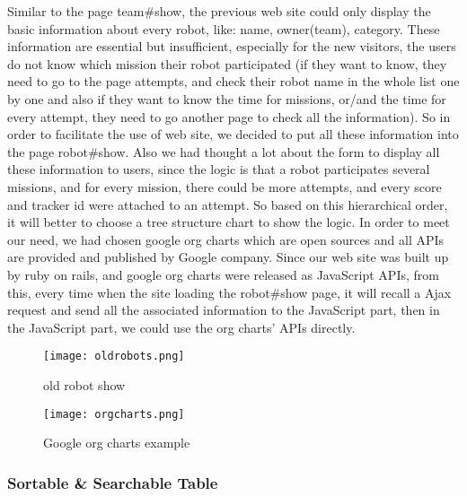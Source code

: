 Similar to the page team\#show, the previous web site could only display the basic information about every robot, like: name, owner(team), category. These information are essential but insufficient, especially for the new visitors, the users do not know which mission their robot participated (if they want to know, they need to go to the page attempts, and check their robot name in the whole list one by one and also if they want to know the time for missions, or/and the time for every attempt, they need to go another page to check all the information). So in order to facilitate the use of web site, we decided to put all these information into the page robot\#show. Also we had thought a lot about the form to display all these information to users, since the logic is that a robot participates several missions, and for every mission, there could be more attempts, and every score and tracker id were attached to an attempt. So based on this hierarchical order, it will better to choose a tree structure chart to show the logic. In order to meet our need, we had chosen google org charts which are open sources and all APIs are provided and published by Google company. Since our web site was built up by ruby on rails, and google org charts were released as JavaScript APIs, from this, every time when the site loading the robot\#show page, it will recall a Ajax request and send all the associated information to the JavaScript part, then in the JavaScript part, we could use the org charts' APIs directly. 
\begin{figure}[h!]
\centering
\texttt{[image: oldrobots.png]}
\caption{old robot show}
\label{fig-sample}
\end{figure}
\begin{figure}[h!]
\centering
\texttt{[image: orgcharts.png]}
\caption{Google org charts example }
\label{fig-sample}
\end{figure}

\subsubsection{Sortable \& Searchable Table}


